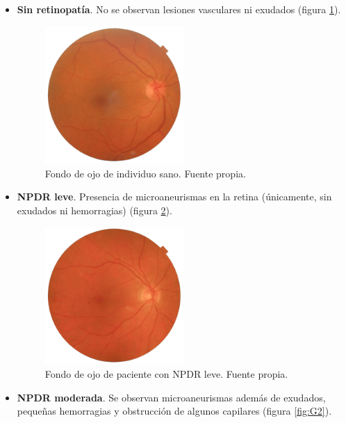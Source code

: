 \begin{itemize}[itemsep=0.25em]
    \item \textbf{Sin retinopatía}. No se observan lesiones vasculares ni exudados (figura \ref{fig:G0}).

    \begin{figure}[h]
        \centering
        \includegraphics[width=0.5\textwidth]{img/G0.png}
        \caption{Fondo de ojo de individuo sano. Fuente propia.}
        \label{fig:G0}
    \end{figure}
    
    \item \textbf{NPDR leve}. Presencia de microaneurismas en la retina (únicamente, sin exudados ni hemorragias) (figura \ref{fig:G1}).

    \begin{figure}[h]
        \centering
        \includegraphics[width=0.5\textwidth]{img/G1.png}
        \caption{Fondo de ojo de paciente con NPDR leve. Fuente propia.}
        \label{fig:G1}
    \end{figure}
    
    \item \textbf{NPDR moderada}. Se observan microaneurismas además de exudados, pequeñas hemorragias y obstrucción de algunos capilares (figura \ref{fig:G2}).


\end{itemize}
